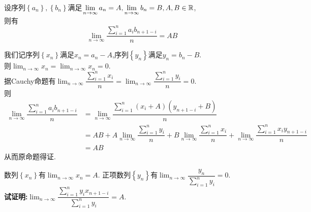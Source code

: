 \documentclass{ctexart}
\begin{document}
\begin{formal}
    设序列$\left\{a_n\right\},\left\{b_n\right\}$满足$\displaystyle\lim_{n\to\infty}{a_n}=A,\lim_{n\to\infty}{b_n}=B,A,B\in\mathbb{R}$,\\
    则有$$\lim_{n\to\infty}{\dfrac{\sum_{i=1}^{n}{a_ib_{n+1-i}}}{n}}=AB$$
\end{formal}
\begin{solution}[Proof.]
    我们记序列$\left\{x_n\right\}$满足$x_n=a_n-A$,序列$\left\{y_n\right\}$满足$y_n=b_n-B$.\\
    则$\displaystyle\lim_{n\to\infty}{x_n}=\lim_{n\to\infty}{x_n}=0$.\\
    据Cauchy命题有$\displaystyle\lim_{n\to\infty}{\dfrac{\sum_{i=1}^{n}{x_i}}{n}}=\lim_{n\to\infty}{\dfrac{\sum_{i=1}^{n}{y_i}}{n}}=0$.\\
    则\begin{align*}
        \lim_{n\to\infty}{\dfrac{\sum_{i=1}^{n}{a_ib_{n+1-i}}}{n}}
        &= \lim_{n\to\infty}{\dfrac{\sum_{i=1}^{n}{(x_i+A)(y_{n+1-i}+B)}}{n}} \\
        &= AB+A\lim_{n\to\infty}{\dfrac{\sum_{i=1}^{n}{y_i}}{n}}+B\lim_{n\to\infty}{\dfrac{\sum_{i=1}^{n}{x_i}}{n}}+\lim_{n\to\infty}{\dfrac{\sum_{i=1}^{n}{x_iy_{n+1-i}}}{n}} \\
        &= AB
    \end{align*}
    从而原命题得证.
\end{solution}
\begin{problem}[例1(24.10.09 SJTU数分小测):]
    数列$\left\{ x_n\right\}$有$\displaystyle\lim_{n\to\infty}{x_n}=A$.
    正项数列$\left\{ y_n\right\}$有$\displaystyle\lim_{n\to\infty}\dfrac{y_n}{\sum_{i=1}^{n}{y_i}}=0$.\\
    \textbf{试证明:}$\displaystyle\lim_{n\to\infty}{\dfrac{\sum_{i=1}^{n}{y_ix_{n+1-i}}}{\sum_{i=1}^{n}{y_i}}}=A.$\\
\end{problem}\noindent
\end{document}
